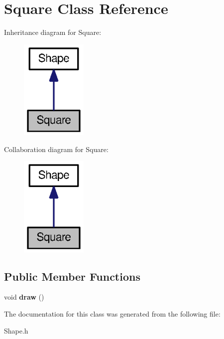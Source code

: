 \section{Square Class Reference}
\label{class_square}


Inheritance diagram for Square\-:
\nopagebreak
\begin{figure}[H]
\begin{center}
\leavevmode
\includegraphics[width=90pt]{class_square__inherit__graph}
\end{center}
\end{figure}


Collaboration diagram for Square\-:
\nopagebreak
\begin{figure}[H]
\begin{center}
\leavevmode
\includegraphics[width=90pt]{class_square__coll__graph}
\end{center}
\end{figure}
\subsection*{Public Member Functions}
\begin{DoxyCompactItemize}
\item 
void {\bfseries draw} ()\label{class_square_a2a8be87e5cb58dd25a8af0f6166536b9}

\end{DoxyCompactItemize}


The documentation for this class was generated from the following file\-:\begin{DoxyCompactItemize}
\item 
Shape.\-h\end{DoxyCompactItemize}
